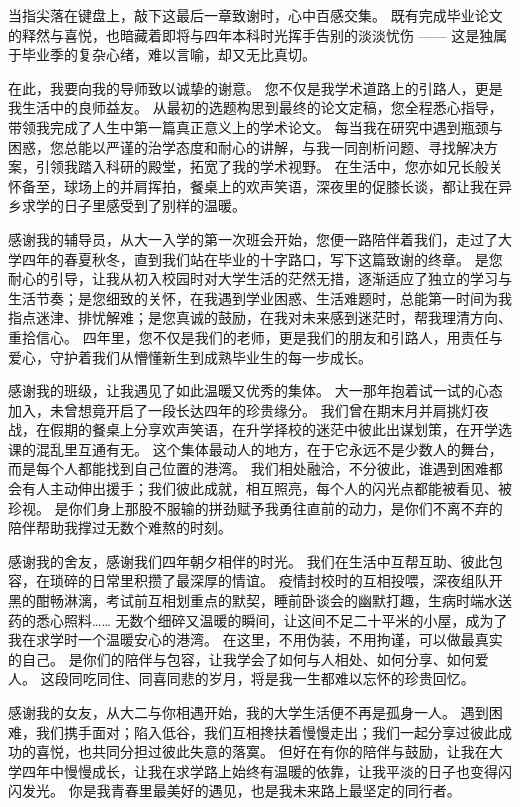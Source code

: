 当指尖落在键盘上，敲下这最后一章致谢时，心中百感交集。
既有完成毕业论文的释然与喜悦，也暗藏着即将与四年本科时光挥手告别的淡淡忧伤 —— 这是独属于毕业季的复杂心绪，难以言喻，却又无比真切。

在此，我要向我的导师致以诚挚的谢意。
您不仅是我学术道路上的引路人，更是我生活中的良师益友。
从最初的选题构思到最终的论文定稿，您全程悉心指导，带领我完成了人生中第一篇真正意义上的学术论文。
每当我在研究中遇到瓶颈与困惑，您总能以严谨的治学态度和耐心的讲解，与我一同剖析问题、寻找解决方案，引领我踏入科研的殿堂，拓宽了我的学术视野。
在生活中，您亦如兄长般关怀备至，球场上的并肩挥拍，餐桌上的欢声笑语，深夜里的促膝长谈，都让我在异乡求学的日子里感受到了别样的温暖。

感谢我的辅导员，从大一入学的第一次班会开始，您便一路陪伴着我们，走过了大学四年的春夏秋冬，直到我们站在毕业的十字路口，写下这篇致谢的终章。
是您耐心的引导，让我从初入校园时对大学生活的茫然无措，逐渐适应了独立的学习与生活节奏；是您细致的关怀，在我遇到学业困惑、生活难题时，总能第一时间为我指点迷津、排忧解难；是您真诚的鼓励，在我对未来感到迷茫时，帮我理清方向、重拾信心。
四年里，您不仅是我们的老师，更是我们的朋友和引路人，用责任与爱心，守护着我们从懵懂新生到成熟毕业生的每一步成长。

感谢我的班级，让我遇见了如此温暖又优秀的集体。
大一那年抱着试一试的心态加入，未曾想竟开启了一段长达四年的珍贵缘分。
我们曾在期末月并肩挑灯夜战，在假期的餐桌上分享欢声笑语，在升学择校的迷茫中彼此出谋划策，在开学选课的混乱里互通有无。
这个集体最动人的地方，在于它永远不是少数人的舞台，而是每个人都能找到自己位置的港湾。
我们相处融洽，不分彼此，谁遇到困难都会有人主动伸出援手；我们彼此成就，相互照亮，每个人的闪光点都能被看见、被珍视。
是你们身上那股不服输的拼劲赋予我勇往直前的动力，是你们不离不弃的陪伴帮助我撑过无数个难熬的时刻。

感谢我的舍友，感谢我们四年朝夕相伴的时光。
我们在生活中互帮互助、彼此包容，在琐碎的日常里积攒了最深厚的情谊。
疫情封校时的互相投喂，深夜组队开黑的酣畅淋漓，考试前互相划重点的默契，睡前卧谈会的幽默打趣，生病时端水送药的悉心照料…… 无数个细碎又温暖的瞬间，让这间不足二十平米的小屋，成为了我在求学时一个温暖安心的港湾。
在这里，不用伪装，不用拘谨，可以做最真实的自己。
是你们的陪伴与包容，让我学会了如何与人相处、如何分享、如何爱人。
这段同吃同住、同喜同悲的岁月，将是我一生都难以忘怀的珍贵回忆。

感谢我的女友，从大二与你相遇开始，我的大学生活便不再是孤身一人。
遇到困难，我们携手面对；陷入低谷，我们互相搀扶着慢慢走出；我们一起分享过彼此成功的喜悦，也共同分担过彼此失意的落寞。
但好在有你的陪伴与鼓励，让我在大学四年中慢慢成长，让我在求学路上始终有温暖的依靠，让我平淡的日子也变得闪闪发光。
你是我青春里最美好的遇见，也是我未来路上最坚定的同行者。

